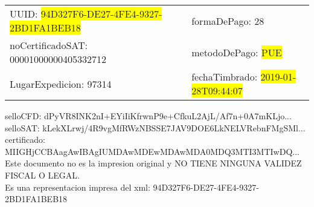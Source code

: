 \documentclass{article}
\begin{document}
\begin{tabular}{p{11cm}p{1cm}p{8cm}}
\bigskip
UUID: \colorbox{yellow}{ 94D327F6-DE27-4FE4-9327-2BD1FA1BEB18 } & & formaDePago: 28\\

noCertificadoSAT: 00001000000405332712 & & metodoDePago: \colorbox{yellow}{ PUE }\\

LugarExpedicion: 97314 & & fechaTimbrado: \colorbox{yellow}{ 2019-01-28T09:44:07 } \\
\end{tabular}

\bigskip
selloCFD: dPyVR8INK2nI+EYiIiKfrwnP9e+CfkuL2AjL/Af7n+0A7mKLjo... \\
selloSAT: kLekXLrwj/4R9vgMfRWzNBSSE7JAV9DOE6LkNELVRebnFMgSMl... \\

certificado: MIIGHjCCBAagAwIBAgIUMDAwMDEwMDAwMDA0MDQ3MTI3MTIwDQ...\bigskip\bigskip\bigskip\bigskip\bigskip\bigskip
\\Este documento no es la impresion original y NO TIENE NINGUNA VALIDEZ FISCAL O LEGAL. \\
 Es una representacion impresa del xml:  94D327F6-DE27-4FE4-9327-2BD1FA1BEB18 \\
\end{document}
